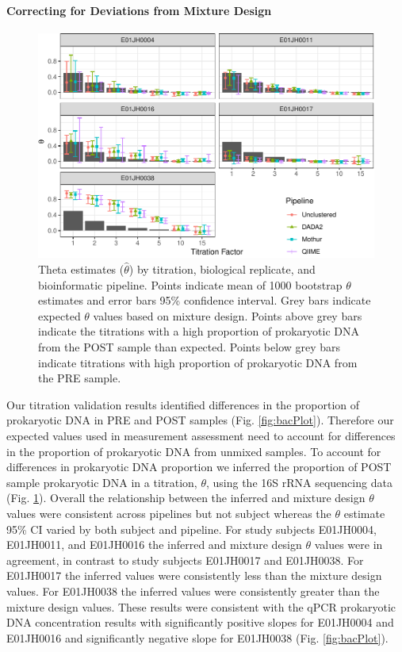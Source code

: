 \documentclass[12pt]{article}
\begin{document}
\paragraph*{Correcting for Deviations from Mixture Design}


\begin{figure}
\centering
\includegraphics[width=0.9\linewidth]{thetaHat-1.pdf}
\caption{\label{fig:thetaHat}Theta estimates (\(\hat{\theta}\)) by titration, biological
replicate, and bioinformatic pipeline. Points indicate mean
of 1000 bootstrap \(\theta\) estimates and error bars 95\% confidence
interval. Grey bars indicate expected \(\theta\) values based on mixture design.
Points above grey bars indicate the titrations with a high proportion of prokaryotic DNA
from the POST sample than expected. Points below grey bars indicate titrations
with high proportion of prokaryotic DNA from the PRE sample.}
\end{figure}

Our titration validation results identified differences in the
proportion of prokaryotic DNA in PRE and POST samples (Fig. \ref{fig:bacPlot}).
Therefore our expected values used in measurement assessment need to account
for differences in the proportion of prokaryotic DNA from unmixed samples.
To account for differences in prokaryotic DNA proportion we inferred
the proportion of POST sample prokaryotic DNA in a titration, \(\theta\), using
the 16S rRNA sequencing data (Fig. \ref{fig:thetaHat}). 
Overall the relationship between the inferred and mixture design \(\theta\) values were
consistent across pipelines but not subject whereas the \(\theta\)
estimate 95\% CI varied by both subject and pipeline. For study subjects
E01JH0004, E01JH0011, and E01JH0016 the inferred and mixture design
\(\theta\) values were in agreement, in contrast to study subjects
E01JH0017 and E01JH0038. For E01JH0017 the inferred values were
consistently less than the mixture design values. For E01JH0038
the inferred values were consistently greater than the mixture design
values. These results were consistent with the qPCR prokaryotic DNA
concentration results with significantly positive slopes for E01JH0004
and E01JH0016 and significantly negative slope for E01JH0038 (Fig.
\ref{fig:bacPlot}).
\end{document}

